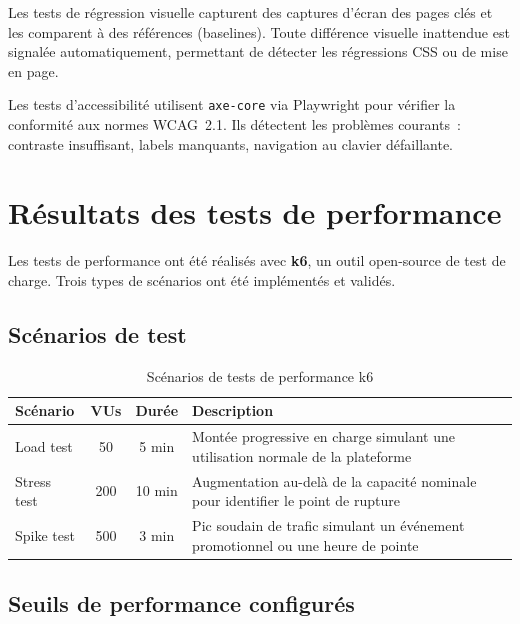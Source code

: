 Les tests de r\'{e}gression visuelle capturent des captures d'\'{e}cran des
pages cl\'{e}s et les comparent \`{a} des r\'{e}f\'{e}rences (baselines). Toute
diff\'{e}rence visuelle inattendue est signal\'{e}e automatiquement, permettant
de d\'{e}tecter les r\'{e}gressions CSS ou de mise en page.

Les tests d'accessibilit\'{e} utilisent \texttt{axe-core} via Playwright
pour v\'{e}rifier la conformit\'{e} aux normes WCAG~2.1. Ils d\'{e}tectent les
probl\`{e}mes courants~: contraste insuffisant, labels manquants, navigation
au clavier d\'{e}faillante.

\section{R\'{e}sultats des tests de performance}
\label{sec:resultats-performance}

Les tests de performance ont \'{e}t\'{e} r\'{e}alis\'{e}s avec \textbf{k6}, un outil
open-source de test de charge. Trois types de sc\'{e}narios ont \'{e}t\'{e}
impl\'{e}ment\'{e}s et valid\'{e}s.

\subsection{Sc\'{e}narios de test}

\begin{table}[H]
\centering
\caption{Sc\'{e}narios de tests de performance k6}
\label{tab:k6-scenarios}
\begin{tabularx}{\textwidth}{|l|c|c|X|}
\hline
\rowcolor{speedlineBlue!10}
\textbf{Sc\'{e}nario} & \textbf{VUs} & \textbf{Dur\'{e}e} & \textbf{Description} \\
\hline
Load test & 50 & 5 min & Mont\'{e}e progressive en charge simulant
  une utilisation normale de la plateforme \\
\hline
Stress test & 200 & 10 min & Augmentation au-del\`{a} de la capacit\'{e}
  nominale pour identifier le point de rupture \\
\hline
Spike test & 500 & 3 min & Pic soudain de trafic simulant un
  \'{e}v\'{e}nement promotionnel ou une heure de pointe \\
\hline
\end{tabularx}
\end{table}

\subsection{Seuils de performance configur\'{e}s}

